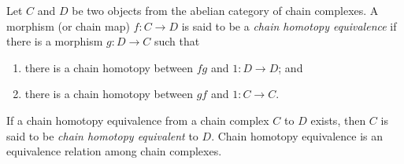 \documentclass[12pt]{article}
\begin{document}

Let $C$ and $D$ be two objects from the abelian category of chain complexes.  A morphism (or chain map) $f\colon C\to D$ is said to be a \emph{chain homotopy equivalence} if there is a morphism $g\colon D\to C$ such that

\begin{enumerate}
\item there is a chain homotopy between $fg$ and $1\colon D\to D$; and 
\item there is a chain homotopy between $gf$ and $1\colon C\to C$.
\end{enumerate}

If a chain homotopy equivalence from a chain complex $C$ to $D$ exists, then $C$ is said to be \emph{chain homotopy equivalent} to $D$.  Chain homotopy equivalence is an equivalence relation among chain complexes.
\end{document}
